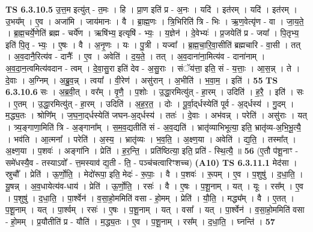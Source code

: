 \documentclass[17pt]{extarticle}
\begin{document}
                  \newline
                                \textbf{ TS 6.3.10.5} \newline
                  उ॒त्त॒म इत्यु॑त् - त॒मः । हि । प्रा॒ण इति॑ प्र - अ॒नः । यदि॑ । इत॑रम् । यदि॑ । इत॑रम् । उ॒भय᳚म् । ए॒व । अजा॑मि । जाय॑मानः । वै । ब्रा॒ह्म॒णः । त्रि॒भिरिति॑ त्रि - भिः । ऋ॒ण॒वेत्यृ॑ण - वा । जा॒य॒ते॒ । ब्र॒ह्म॒चर्ये॒णेति॑ ब्रह्म - चर्ये॑ण । ऋषि॑भ्य॒ इत्यृषि॑ - भ्यः॒ । य॒ज्ञेन॑ । दे॒वेभ्यः॑ । प्र॒जयेति॑ प्र - जया᳚ । पि॒तृभ्य॒ इति॑ पि॒तृ - भ्यः॒ । ए॒षः । वै । अ॒नृ॒णः । यः । पु॒त्री । यज्वा᳚ । ब्र॒ह्म॒चा॒रि॒वा॒सीति॑ ब्रह्मचारि - वा॒सी । तत् । अ॒व॒दानै॒रित्य॑व - दानैः᳚ । ए॒व । अवेति॑ । द॒य॒ते॒ । तत् । अ॒व॒दाना॑ना॒मित्य॑व - दाना॑नाम् । अ॒व॒दा॒न॒त्वमित्य॑वदान - त्वम् । दे॒वा॒सु॒रा इति॑ देव - अ॒सु॒राः । संॅय॑त्ता॒ इति॒ सं - य॒त्ताः॒ । आ॒स॒न्न् । ते । दे॒वाः । अ॒ग्निम् । अ॒ब्रु॒व॒न्न् । त्वया᳚ । वी॒रेण॑ । असु॑रान् । अ॒भीति॑ । भ॒वा॒म॒ । इति॑ । \textbf{  55} \newline
                  \newline
                                \textbf{ TS 6.3.10.6} \newline
                  सः । अ॒ब्र॒वी॒त् । वर᳚म् । वृ॒णै॒ । प॒शोः । उ॒द्धा॒रमित्यु॑त् - हा॒रम् । उदिति॑ । ह॒रै॒ । इति॑ । सः । ए॒तम् । उ॒द्धा॒रमित्यु॑त् - हा॒रम् । उदिति॑ । अ॒ह॒र॒त॒ । दोः । पू॒र्वा॒द्‌र्धस्येति॑ पूर्व - अ॒द्‌र्धस्य॑ । गु॒दम् । म॒द्ध्य॒तः । श्रोणि᳚म् । ज॒घ॒ना॒द्‌र्धस्येति॑ जघन-अ॒द्‌र्धस्य॑ । ततः॑ । दे॒वाः । अभ॑वन्न् । परेति॑ । असु॑राः । यत् । त्र्य॒ङ्गाणा॒मिति॑ त्रि - अ॒ङ्गाना᳚म् । स॒म॒व॒द्यतीति॑ सं - अ॒व॒द्यति॑ । भ्रातृ॑व्याभिभूत्या॒ इति॒ भ्रातृ॑व्य-अ॒भि॒भू॒त्यै॒ । भव॑ति । आ॒त्मना᳚ । परेति॑ । अ॒स्य॒ । भ्रातृ॑व्यः । भ॒व॒ति॒ । अ॒क्ष्ण॒या । अवेति॑ । द्य॒ति॒ । तस्मा᳚त् । अ॒क्ष्ण॒या । प॒शवः॑ । अङ्गा॑नि । प्रेति॑ । ह॒र॒न्ति॒ । प्रति॑ष्ठित्या॒ इति॒ प्रति॑ - स्थि॒त्यै॒ ॥ \textbf{  56 } \newline
                  \newline
                      (ए॒तौ प॑शू॒नाꣳ - समे॑धस्यै॒व - तस्याऽवो᳚ - त्त॒मस्याव॑ द्य॒ती - ति॒ - पञ्च॑चत्वारिꣳशच्च)  \textbf{(A10)} \newline \newline
                                \textbf{ TS 6.3.11.1} \newline
                  मेद॑सा । स्रुचौ᳚ । प्रेति॑ । ऊ॒र्णो॒ति॒ । मेदो॑रूपा॒ इति॒ मेदः॑ - रू॒पाः॒ । वै । प॒शवः॑ । रू॒पम् । ए॒व । प॒शुषु॑ । द॒धा॒ति॒ । यू॒षन्न् । अ॒व॒धायेत्य॑व-धाय॑ । प्रेति॑ । ऊ॒र्णो॒ति॒ । रसः॑ । वै । ए॒षः । प॒शू॒नाम् । यत् । यूः । रस᳚म् । ए॒व । प॒शुषु॑ । द॒धा॒ति॒ । पा॒र्श्वेन॑ । व॒सा॒हो॒ममिति॑ वसा - हो॒मम् । प्रेति॑ । यौ॒ति॒ । मद्ध्य᳚म् । वै । ए॒तत् । प॒शू॒नाम् । यत् । पा॒र्श्वम् । रसः॑ । ए॒षः । प॒शू॒नाम् । यत् । वसा᳚ । यत् । पा॒र्श्वेन॑ । व॒सा॒हो॒ममिति॑ वसा - हो॒मम् । प्र॒यौतीति॑ प्र - यौति॑ । म॒द्ध्य॒तः । ए॒व । प॒शू॒नाम् । रस᳚म् । द॒धा॒ति॒ । घ्नन्ति॑ । \textbf{  57} \newline
\end{document}

